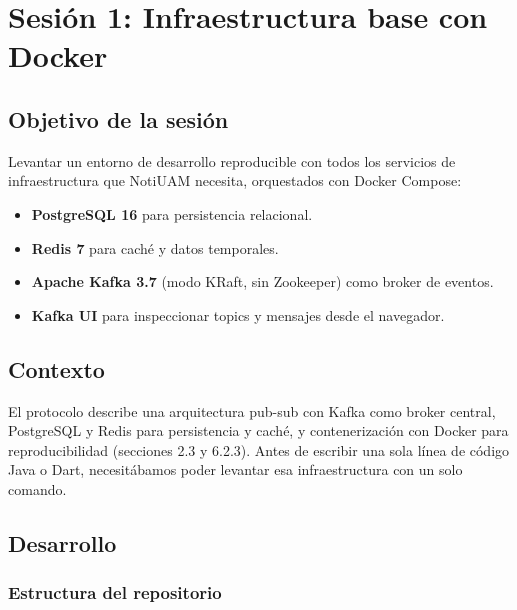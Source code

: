 
\chapter{Sesión 1: Infraestructura base con Docker}
\label{ch:sesion1}

\section{Objetivo de la sesión}

Levantar un entorno de desarrollo reproducible con todos los servicios de infraestructura que NotiUAM necesita, orquestados con Docker Compose:
\begin{itemize}[leftmargin=*]
  \item \textbf{PostgreSQL 16} para persistencia relacional.
  \item \textbf{Redis 7} para caché y datos temporales.
  \item \textbf{Apache Kafka 3.7} (modo KRaft, sin Zookeeper) como broker de eventos.
  \item \textbf{Kafka UI} para inspeccionar topics y mensajes desde el navegador.
\end{itemize}

\section{Contexto}

El protocolo describe una arquitectura pub-sub con Kafka como broker central, PostgreSQL y Redis para persistencia y caché, y contenerización con Docker para reproducibilidad (secciones 2.3 y 6.2.3). Antes de escribir una sola línea de código Java o Dart, necesitábamos poder levantar esa infraestructura con un solo comando.

\section{Desarrollo}

\subsection{Estructura del repositorio}

